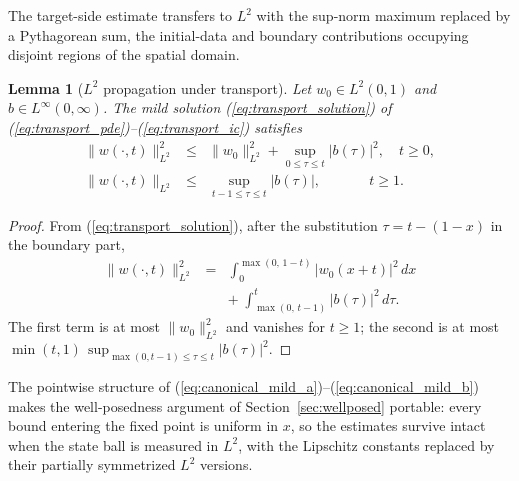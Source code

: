 \documentclass[10pt,a4paper]{amsart}
\newtheorem{lemma}{Lemma}
\newcommand{\Linf}{L^\infty}
\newcommand{\Ltwo}{L^2}
\begin{document}
The target-side estimate transfers to $\Ltwo$ with the sup-norm maximum replaced by a Pythagorean sum, the initial-data and boundary contributions occupying disjoint regions of the spatial domain.

\begin{lemma}[$\Ltwo$ propagation under transport]\label{lem:transportL2}
Let $w_0 \in \Ltwo(0,1)$ and $b \in \Linf(0,\infty)$. The mild solution (\ref{eq:transport_solution}) of (\ref{eq:transport_pde})--(\ref{eq:transport_ic}) satisfies
\begin{eqnarray}
\|w(\cdot,t)\|_{\Ltwo}^2 &\le& \|w_0\|_{\Ltwo}^2 + \sup_{0 \le \tau \le t}|b(\tau)|^2, \quad t \ge 0, \nonumber \\
\|w(\cdot,t)\|_{\Ltwo} &\le& \sup_{t-1 \le \tau \le t}|b(\tau)|, \qquad\quad\ \  t \ge 1.
\label{eq:transportL2}
\end{eqnarray}
\end{lemma}

\begin{proof}
From (\ref{eq:transport_solution}), after the substitution $\tau = t - (1-x)$ in the boundary part,
\begin{eqnarray}
\|w(\cdot,t)\|_{\Ltwo}^2 &=& \int_0^{\max(0,\,1-t)} |w_0(x+t)|^2\, dx \nonumber \\
&& +\; \int_{\max(0,\,t-1)}^{t} |b(\tau)|^2\, d\tau.
\label{eq:transportL2_split}
\end{eqnarray}
The first term is at most $\|w_0\|_{\Ltwo}^2$ and vanishes for $t \ge 1$; the second is at most $\min(t,1)\, \sup_{\max(0,t-1) \le \tau \le t}|b(\tau)|^2$.
\end{proof}

The pointwise structure of (\ref{eq:canonical_mild_a})--(\ref{eq:canonical_mild_b}) makes the well-posedness argument of Section~\ref{sec:wellposed} portable: every bound entering the fixed point is uniform in $x$, so the estimates survive intact when the state ball is measured in $\Ltwo$, with the Lipschitz constants replaced by their partially symmetrized $\Ltwo$ versions.
\end{document}
